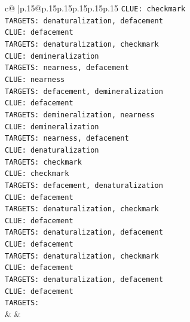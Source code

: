 \documentclass{article}
\begin{document}
{\begin{supertabular}{c@{$\;$}|p{.15\linewidth}@{}p{.15\linewidth}p{.15\linewidth}p{.15\linewidth}p{.15\linewidth}p{.15\linewidth}}
{{{\texttt{CLUE: checkmark} \\
\texttt{TARGETS: denaturalization, defacement} \\
\texttt{CLUE: defacement} \\
\texttt{TARGETS: denaturalization, checkmark} \\
\texttt{CLUE: demineralization} \\
\texttt{TARGETS: nearness, defacement} \\
\texttt{CLUE: nearness} \\
\texttt{TARGETS: defacement, demineralization} \\
\texttt{CLUE: defacement} \\
\texttt{TARGETS: demineralization, nearness} \\
\texttt{CLUE: demineralization} \\
\texttt{TARGETS: nearness, defacement} \\
\texttt{CLUE: denaturalization} \\
\texttt{TARGETS: checkmark} \\
\texttt{CLUE: checkmark} \\
\texttt{TARGETS: defacement, denaturalization} \\
\texttt{CLUE: defacement} \\
\texttt{TARGETS: denaturalization, checkmark} \\
\texttt{CLUE: defacement} \\
\texttt{TARGETS: denaturalization, defacement} \\
\texttt{CLUE: defacement} \\
\texttt{TARGETS: denaturalization, checkmark} \\
\texttt{CLUE: defacement} \\
\texttt{TARGETS: denaturalization, defacement} \\
\texttt{CLUE: defacement} \\
\texttt{TARGETS:} \\
            }
        }
    }
    & & \\ \\


\end{supertabular}}
\end{document}
